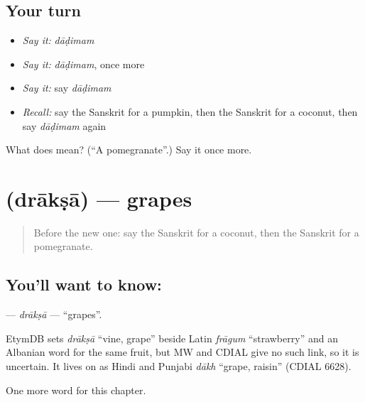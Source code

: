 \subsection*{Your turn}
\begin{itemize}
\raggedright
  \item \emph{Say it:} \emph{dāḍimam}
  \item \emph{Say it:} \emph{dāḍimam}, once more
  \item \emph{Say it:} say \emph{dāḍimam}
  \item \emph{Recall:} say the Sanskrit for a pumpkin, then the Sanskrit for a coconut, then say \emph{dāḍimam} again
\end{itemize}

\begin{tcolorbox}[breakable,colback=teal!4,colframe=teal!35!black,title={Before you move on}]
What does  mean? (\textquotedblleft{}A pomegranate\textquotedblright{}.) Say it once more.
\end{tcolorbox}
\section[\texorpdfstring{\sk{द्राक्षा} (drākṣā)}{द्राक्षा (drākṣā)}]{ (drākṣā) — grapes}

\label{lesson:SA-C109-draksa}



\begin{quote}
Before the new one: say the Sanskrit for a coconut, then the Sanskrit for a pomegranate.
\end{quote}

\subsection*{You'll want to know: }
\textbf{} — \emph{drākṣā} — \textquotedblleft{}grapes\textquotedblright{}.

\begin{cousinweb}
EtymDB sets \emph{drākṣā} \textquotedblleft{}vine, grape\textquotedblright{} beside Latin \emph{frāgum} \textquotedblleft{}strawberry\textquotedblright{} and an Albanian word for the same fruit, but MW and CDIAL give no such link, so it is uncertain. It lives on as Hindi and Punjabi \emph{dākh} \textquotedblleft{}grape, raisin\textquotedblright{} (CDIAL 6628).
\end{cousinweb}

\begin{grammarlens}[title={What you've built}]
One more word for this chapter.
\end{grammarlens}

